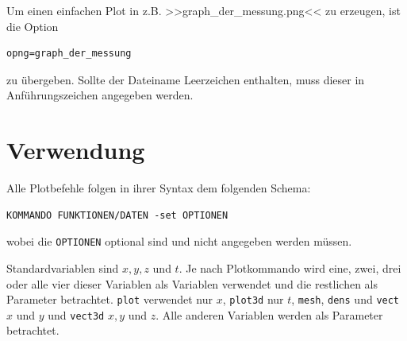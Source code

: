 \documentclass[DIV=14,headsepline,footsepline]{scrbook}
\begin{document}
				Um einen einfachen Plot in z.B. >>graph\_der\_messung.png<< zu erzeugen, ist die Option
				\begin{lstlisting}
opng=graph_der_messung
				\end{lstlisting}
				zu übergeben. Sollte der Dateiname Leerzeichen enthalten, muss dieser in Anführungszeichen angegeben werden.
				
			\section{Verwendung}
				Alle Plotbefehle folgen in ihrer Syntax dem folgenden Schema:
				\begin{lstlisting}
KOMMANDO FUNKTIONEN/DATEN -set OPTIONEN
				\end{lstlisting}
				wobei die \verb+OPTIONEN+ optional sind und nicht angegeben werden müssen.
				
				Standardvariablen sind $x, y, z$ und $t$. Je nach Plotkommando wird eine, zwei, drei oder alle vier dieser Variablen als Variablen verwendet und die restlichen als Parameter betrachtet. \verb+plot+ verwendet nur $x$, \verb+plot3d+ nur $t$, \verb+mesh+, \verb+dens+ und \verb+vect+ $x$ und $y$ und \verb+vect3d+ $x,y$ und $z$. Alle anderen Variablen werden als Parameter betrachtet.
				
\end{document}
